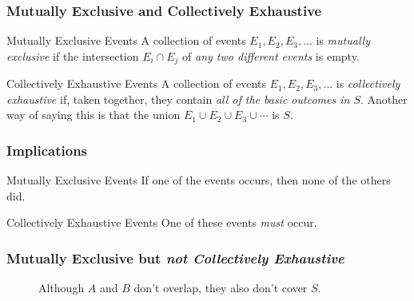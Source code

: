 \begin{frame}
\frametitle{Mutually Exclusive and Collectively Exhaustive}
\begin{block}{Mutually Exclusive Events}
A collection of events $E_1, E_2, E_3, \hdots$ is \emph{\alert{mutually exclusive}} if the intersection $E_i \cap E_j$ of \alert{\emph{any two different events}} is empty.
\end{block}

\begin{block}{Collectively Exhaustive Events}
A collection of events $E_1, E_2, E_3, \hdots$ is \emph{\alert{collectively exhaustive}} if, taken together, they contain \alert{\emph{all of the basic outcomes in $S$}}. Another way of saying this is that the union $E_1 \cup E_2 \cup E_3 \cup \cdots$ is $S$.
\end{block}
\end{frame}
\begin{frame}
\frametitle{Implications}
\begin{block}{Mutually Exclusive Events}
  If one of the events occurs, then none of the others did.
\end{block}

\begin{block}{Collectively Exhaustive Events}
  One of these events \emph{must} occur.
\end{block}
\end{frame}
\def\Srect{(-2,-2) rectangle (4,2)}
\def\Arect{(-2,-2) rectangle (0,2)}
\def\Brect{(0,-2) rectangle (2,2)}
\def\Crect{(0,2) rectangle (4,2)}
\def\Devent{(1.6,-0.3) circle (1.3)}
\def\Eevent{(-1,1.2) circle (0.5)}
\begin{frame}
\frametitle{Mutually Exclusive but \emph{not Collectively Exhaustive}}
\begin{figure}
\centering
{}
\caption{Although $A$ and $B$ don't overlap, they also don't cover $S$.}
\end{figure}
\end{frame}

